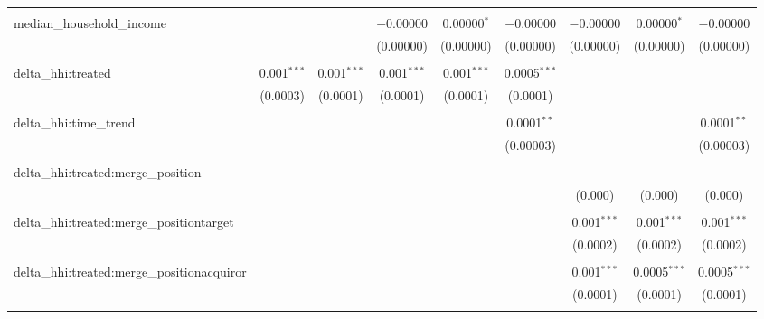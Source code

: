 \begin{table}[H]
{\begin{tabular}{@{\extracolsep{5pt}}lcccccccc}
   & & & & & & & & \\  

  median\_household\_income &  &  & $-$0.00000 & 0.00000$^{*}$ & $-$0.00000 & $-$0.00000 & 0.00000$^{*}$ & $-$0.00000 \\  

   &  &  & (0.00000) & (0.00000) & (0.00000) & (0.00000) & (0.00000) & (0.00000) \\  

   & & & & & & & & \\  

  delta\_hhi:treated & 0.001$^{***}$ & 0.001$^{***}$ & 0.001$^{***}$ & 0.001$^{***}$ & 0.0005$^{***}$ &  &  &  \\  

   & (0.0003) & (0.0001) & (0.0001) & (0.0001) & (0.0001) &  &  &  \\  

   & & & & & & & & \\  

  delta\_hhi:time\_trend &  &  &  &  & 0.0001$^{**}$ &  &  & 0.0001$^{**}$ \\  

   &  &  &  &  & (0.00003) &  &  & (0.00003) \\  

   & & & & & & & & \\  

  delta\_hhi:treated:merge\_position &  &  &  &  &  &  &  &  \\  

   &  &  &  &  &  & (0.000) & (0.000) & (0.000) \\  

   & & & & & & & & \\  

  delta\_hhi:treated:merge\_positiontarget &  &  &  &  &  & 0.001$^{***}$ & 0.001$^{***}$ & 0.001$^{***}$ \\  

   &  &  &  &  &  & (0.0002) & (0.0002) & (0.0002) \\  

   & & & & & & & & \\  

  delta\_hhi:treated:merge\_positionacquiror &  &  &  &  &  & 0.001$^{***}$ & 0.0005$^{***}$ & 0.0005$^{***}$ \\  

   &  &  &  &  &  & (0.0001) & (0.0001) & (0.0001) \\  

   & & & & & & & & \\  


\end{tabular}}
\end{table}

